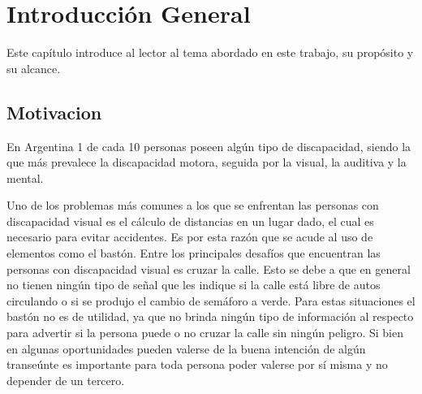 
\chapter{Introducción General} %

\label{Chapter1} %
\label{IntroGeneral}


\newcommand{\keyword}[1]{\textbf{#1}}
\newcommand{\tabhead}[1]{\textbf{#1}}
\newcommand{\code}[1]{\texttt{#1}}
\newcommand{\file}[1]{\texttt{\bfseries#1}}
\newcommand{\option}[1]{\texttt{\itshape#1}}
\newcommand{\grados}{$^{\circ}$}




Este capítulo introduce al lector al tema abordado en este trabajo, su propósito y su alcance.

\section{Motivacion}

En Argentina 1 de cada 10 personas poseen algún tipo de discapacidad, siendo la que más prevalece la discapacidad motora, seguida por la visual, la auditiva y la mental.

Uno de los problemas más comunes a los que se enfrentan las personas con discapacidad visual es el cálculo de distancias en un lugar dado, el cual es necesario para evitar accidentes. Es por esta razón que se acude al uso de elementos como el bastón. Entre los principales desafíos que encuentran las personas con discapacidad visual es cruzar la calle. Esto se debe a que en general no tienen ningún tipo de señal que les indique si la calle está libre de autos circulando o si se produjo el cambio de semáforo a verde. Para estas situaciones el bastón no es de utilidad, ya que no brinda ningún tipo de información al respecto para advertir si la persona puede o no cruzar la calle sin ningún peligro. Si bien en algunas oportunidades pueden valerse de la buena intención de algún transeúnte es importante para toda persona poder valerse por sí misma y no depender de un tercero. 



